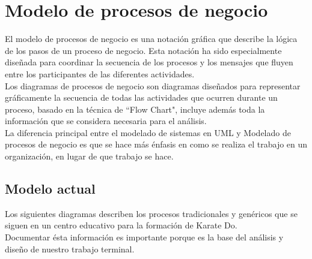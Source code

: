 \chapter{Modelo de procesos de negocio}
El modelo de procesos de negocio es una notación gráfica que describe la lógica de los pasos de un proceso de negocio. Esta notación ha sido especialmente diseñada para coordinar la secuencia de los procesos y los mensajes que fluyen entre los participantes de las diferentes actividades.\\

Los diagramas de procesos de negocio son diagramas diseñados para representar gráficamente la secuencia de todas las actividades que ocurren durante un proceso, basado en la técnica de ``Flow Chart", incluye además toda la información que se considera necesaria para el análisis.\\

La diferencia principal entre el modelado de sistemas en UML y Modelado de procesos de negocio es que se hace más énfasis en como se realiza el trabajo en un organización, en lugar de que trabajo se hace.
\section{Modelo actual}
Los siguientes diagramas describen los procesos tradicionales y genéricos que se siguen en un centro educativo para la formación de Karate Do.\\

Documentar ésta información es importante porque es la base del análisis y diseño de nuestro trabajo terminal.\\

